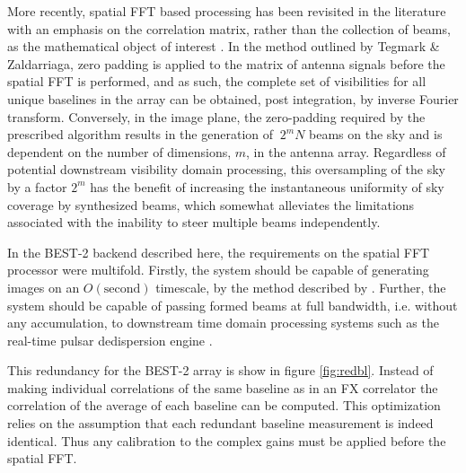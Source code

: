 \documentclass[useAMS,macros,usenatbib,onecolumn]{mn2e}
\begin{document}
More recently, spatial FFT based processing has been revisited in the literature with an emphasis on the correlation matrix, rather than the collection of beams, as the mathematical object of interest \citep{fftt} \citep{omniscope}.
In the method outlined by Tegmark \& Zaldarriaga, zero padding is applied to the matrix of antenna signals before the spatial FFT is performed, and as such, the complete set of visibilities for all unique baselines in the array can be obtained, post integration, by inverse Fourier transform.
Conversely, in the image plane, the zero-padding required by the prescribed algorithm results in the generation of $~2^{m}N$ beams on the sky and is dependent on the number of dimensions, $m$, in the antenna array.
Regardless of potential downstream visibility domain processing, this oversampling of the sky by a factor $2^{m}$ has the benefit of increasing the instantaneous uniformity of sky coverage by synthesized beams, which somewhat alleviates the limitations associated with the inability to steer multiple beams independently.

In the BEST-2 backend described here, the requirements on the spatial FFT processor were multifold.
Firstly, the system should be capable of generating images on an $O(\mathrm{second})$ timescale, by the method described by \citep{fftt}.
Further, the system should be capable of passing formed beams at full bandwidth, i.e. without any accumulation, to downstream time domain processing systems such as the real-time pulsar dedispersion engine \citep{dedispersion}. 

This redundancy for the BEST-2 array is show in figure \ref{fig:redbl}.
Instead of making individual correlations of the same baseline as in an FX correlator the correlation of the average of each baseline can be computed.
This optimization relies on the assumption that each redundant baseline measurement is indeed identical.
Thus any calibration to the complex gains must be applied before the spatial FFT.
\end{document}
